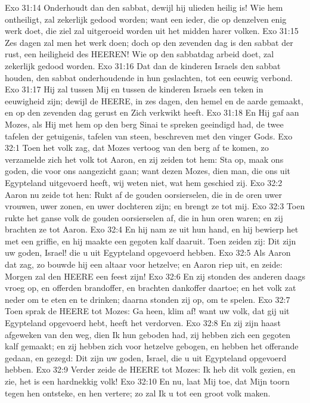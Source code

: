 Exo 31:14  Onderhoudt dan den sabbat, dewijl hij ulieden heilig is! Wie hem ontheiligt, zal zekerlijk gedood worden; want een ieder, die op denzelven enig werk doet, die ziel zal uitgeroeid worden uit het midden harer volken.
Exo 31:15  Zes dagen zal men het werk doen; doch op den zevenden dag is den sabbat der rust, een heiligheid des HEEREN! Wie op den sabbatdag arbeid doet, zal zekerlijk gedood worden.
Exo 31:16  Dat dan de kinderen Israels den sabbat houden, den sabbat onderhoudende in hun geslachten, tot een eeuwig verbond.
Exo 31:17  Hij zal tussen Mij en tussen de kinderen Israels een teken in eeuwigheid zijn; dewijl de HEERE, in zes dagen, den hemel en de aarde gemaakt, en op den zevenden dag gerust en Zich verkwikt heeft.
Exo 31:18  En Hij gaf aan Mozes, als Hij met hem op den berg Sinai te spreken geeindigd had, de twee tafelen der getuigenis, tafelen van steen, beschreven met den vinger Gods.
Exo 32:1  Toen het volk zag, dat Mozes vertoog van den berg af te komen, zo verzamelde zich het volk tot Aaron, en zij zeiden tot hem: Sta op, maak ons goden, die voor ons aangezicht gaan; want dezen Mozes, dien man, die ons uit Egypteland uitgevoerd heeft, wij weten niet, wat hem geschied zij.
Exo 32:2  Aaron nu zeide tot hen: Rukt af de gouden oorsierselen, die in de oren uwer vrouwen, uwer zonen, en uwer dochteren zijn; en brengt ze tot mij.
Exo 32:3  Toen rukte het ganse volk de gouden oorsierselen af, die in hun oren waren; en zij brachten ze tot Aaron.
Exo 32:4  En hij nam ze uit hun hand, en hij bewierp het met een griffie, en hij maakte een gegoten kalf daaruit. Toen zeiden zij: Dit zijn uw goden, Israel! die u uit Egypteland opgevoerd hebben.
Exo 32:5  Als Aaron dat zag, zo bouwde hij een altaar voor hetzelve; en Aaron riep uit, en zeide: Morgen zal den HEERE een feest zijn!
Exo 32:6  En zij stonden des anderen daags vroeg op, en offerden brandoffer, en brachten dankoffer daartoe; en het volk zat neder om te eten en te drinken; daarna stonden zij op, om te spelen.
Exo 32:7  Toen sprak de HEERE tot Mozes: Ga heen, klim af! want uw volk, dat gij uit Egypteland opgevoerd hebt, heeft het verdorven.
Exo 32:8  En zij zijn haast afgeweken van den weg, dien Ik hun geboden had, zij hebben zich een gegoten kalf gemaakt; en zij hebben zich voor hetzelve gebogen, en hebben het offerande gedaan, en gezegd: Dit zijn uw goden, Israel, die u uit Egypteland opgevoerd hebben.
Exo 32:9  Verder zeide de HEERE tot Mozes: Ik heb dit volk gezien, en zie, het is een hardnekkig volk!
Exo 32:10  En nu, laat Mij toe, dat Mijn toorn tegen hen ontsteke, en hen vertere; zo zal Ik u tot een groot volk maken.

